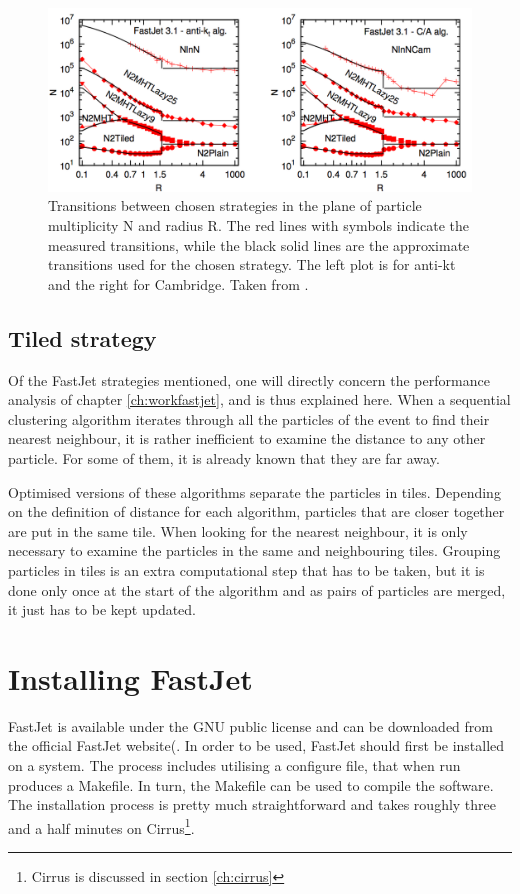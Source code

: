 \begin{figure}[H]
    \centering
    \includegraphics[width=\linewidth]{images/fjstrategy.png}
    \caption{Transitions between chosen strategies in the plane of particle multiplicity N and radius R. The red lines with symbols indicate the measured transitions, while the black solid lines are the
approximate transitions used for the chosen strategy. The left plot is for anti-kt and the right for Cambridge. Taken from \cite{cacciari2012fastjet}.}
    \label{fig:fjstrategy}
\end{figure}


\subsection{Tiled strategy}\label{ch:tiled}
Of the FastJet strategies mentioned, one will directly concern the performance analysis of chapter \ref{ch:workfastjet}, and is thus explained here. When a sequential clustering algorithm iterates through all the particles of the event to find their nearest neighbour, it is rather inefficient to examine the distance to any other particle. For some of them, it is already known that they are far away.

Optimised versions of these algorithms separate the particles in tiles. Depending on the definition of distance for each algorithm, particles that are closer together are put in the same tile. When looking for the nearest neighbour, it is only necessary to examine the particles in the same and neighbouring tiles. Grouping particles in tiles is an extra computational step that has to be taken, but it is done only once at the start of the algorithm and as pairs of particles are merged, it just has to be kept updated.

\section{Installing FastJet}\label{ch:fjtech}
FastJet is available under the GNU public license and can be downloaded from the official FastJet website(\cite{fastjet_site}. In order to be used, FastJet should first be installed on a system. The process includes utilising a configure file, that when run produces a Makefile. In turn, the Makefile can be used to compile the software. The installation process is pretty much straightforward and takes roughly three and a half  minutes on Cirrus\footnote{Cirrus is discussed in section \ref{ch:cirrus}}.  


